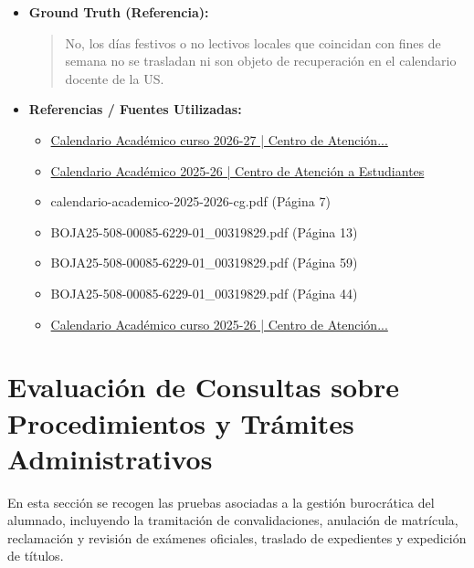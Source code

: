 \documentclass[12pt,a4paper,oneside]{report}
\begin{document}
\begin{itemize}
\begin{itemize}
\begin{quote}
Sin embargo, para determinar con precisión cuáles son los días festivos locales que se recuperan, necesitaría saber si estás refiriéndote al calendario académico de un curso en particular. ¿Podrías decirme si estás buscando información para el curso 2025-2026 o el curso 2026-2027?
                \end{quote}
          \item \textbf{{Ground Truth (Referencia):}} \\
                \begin{quote}
No, los días festivos o no lectivos locales que coincidan con fines de semana no se trasladan ni son objeto de recuperación en el calendario docente de la US.
                \end{quote}
          \item \textbf{{Referencias / Fuentes Utilizadas:}} \\
                \begin{itemize}
                  \item \href{https://cat.us.es/noticias/calendario-academico-curso-2026-27}{Calendario Académico curso 2026-27 | Centro de Atención...}
                  \item \href{https://cat.us.es/vida-academica/calendario-academico-2025-26}{Calendario Académico 2025-26 | Centro de Atención a Estudiantes}
                  \item calendario-academico-2025-2026-cg.pdf (Página 7)
                  \item BOJA25-508-00085-6229-01\_00319829.pdf (Página 13)
                  \item BOJA25-508-00085-6229-01\_00319829.pdf (Página 59)
                  \item BOJA25-508-00085-6229-01\_00319829.pdf (Página 44)
                  \item \href{https://cat.us.es/noticias/calendario-academico-curso-2025-26}{Calendario Académico curso 2025-26 | Centro de Atención...}
                \end{itemize}
        \end{itemize}

  
\end{itemize}

\section{Evaluación de Consultas sobre Procedimientos y Trámites Administrativos}
En esta sección se recogen las pruebas asociadas a la gestión burocrática del alumnado, incluyendo la tramitación de convalidaciones, anulación de matrícula, reclamación y revisión de exámenes oficiales, traslado de expedientes y expedición de títulos.
\end{document}
